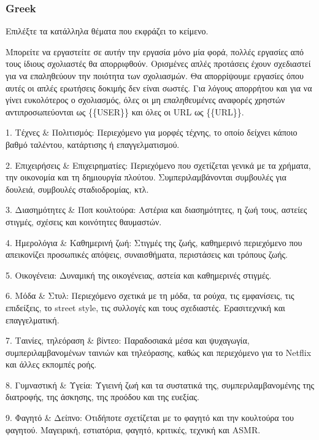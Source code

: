 \subsubsection{Greek}
Επιλέξτε τα κατάλληλα θέματα που εκφράζει το κείμενο.

Μπορείτε να εργαστείτε σε αυτήν την εργασία μόνο μία φορά, πολλές εργασίες από τους ίδιους σχολιαστές θα απορριφθούν. Ορισμένες απλές προτάσεις έχουν σχεδιαστεί για να επαληθεύουν την ποιότητα των σχολιασμών. Θα απορρίψουμε εργασίες όπου αυτές οι απλές ερωτήσεις δοκιμής δεν είναι σωστές.
Για λόγους απορρήτου και για να γίνει ευκολότερος ο σχολιασμός, όλες οι μη επαληθευμένες αναφορές χρηστών αντιπροσωπεύονται ως  \{\{USER\}\}  και όλες οι  URL  ως  \{\{URL\}\}.

1. Τέχνες \& Πολιτισμός: Περιεχόμενο για μορφές τέχνης, το οποίο δείχνει κάποιο βαθμό ταλέντου, κατάρτισης ή επαγγελματισμού.

2. Επιχειρήσεις \& Επιχειρηματίες: Περιεχόμενο που σχετίζεται γενικά με τα χρήματα, την οικονομία και τη δημιουργία πλούτου. Συμπεριλαμβάνονται συμβουλές για δουλειά, συμβουλές σταδιοδρομίας, κτλ.

3. Διασημότητες \& Ποπ κουλτούρα: Αστέρια και διασημότητες, η ζωή τους, αστείες στιγμές, σχέσεις και κοινότητες θαυμαστών.

4. Ημερολόγια \& Καθημερινή ζωή: Στιγμές της ζωής, καθημερινό περιεχόμενο που απεικονίζει προσωπικές απόψεις, συναισθήματα, περιστάσεις και τρόπους ζωής.

5. Οικογένεια: Δυναμική της οικογένειας, αστεία και καθημερινές στιγμές.

6. Μόδα \& Στυλ: Περιεχόμενο σχετικά με τη μόδα, τα ρούχα, τις εμφανίσεις, τις επιδείξεις, το street style, τις συλλογές και τους σχεδιαστές. Ερασιτεχνική και επαγγελματική.

7. Ταινίες, τηλεόραση \& βίντεο: Παραδοσιακά μέσα και ψυχαγωγία, συμπεριλαμβανομένων ταινιών και τηλεόρασης, καθώς και περιεχόμενο για το Netflix και άλλες εκπομπές ροής.

8. Γυμναστική \& Υγεία: Υγιεινή ζωή και τα συστατικά της, συμπεριλαμβανομένης της διατροφής, της άσκησης, της προόδου και της ευεξίας.

9. Φαγητό \& Δείπνο: Οτιδήποτε σχετίζεται με το φαγητό και την κουλτούρα του φαγητού. Μαγειρική, εστιατόρια, φαγητό, κριτικές, τεχνική και ASMR.

